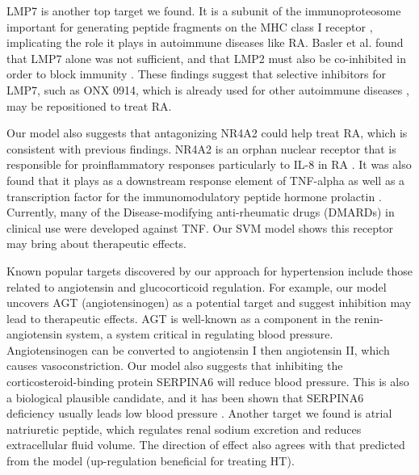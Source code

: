     LMP7 is another top target we found. It is a subunit of the immunoproteosome important for generating peptide fragments on the MHC class I receptor \cite{joeris2012proteasome}, implicating the role it plays in autoimmune diseases like RA. Basler et al. found that LMP7 alone was not sufficient, and that LMP2 must also be co-inhibited in order to block immunity \cite{basler2018co}. These findings suggest that selective inhibitors for LMP7, such as ONX 0914, which is already used for other autoimmune diseases \cite{althof2018immunoproteasome,liu2017onx,verbrugge2012targeting}, may be repositioned to treat RA.
    
    Our model also suggests that antagonizing NR4A2 could help treat RA, which is consistent with previous findings. NR4A2 is an orphan nuclear receptor that is responsible for proinflammatory responses particularly to IL-8 in RA \cite{aherne2009identification}. It was also found that it plays as a downstream response element of TNF-alpha \cite{mix2012orphan} as well as a transcription factor for the immunomodulatory peptide hormone prolactin \cite{mccoy2015orphan}. Currently, many of the Disease-modifying anti-rheumatic drugs (DMARDs) in clinical use were developed against TNF. Our SVM model shows this receptor may bring about therapeutic effects. 

    Known popular targets discovered by our approach for hypertension include those related to  angiotensin and glucocorticoid regulation. For example, our model uncovers AGT (angiotensinogen) as a potential target and suggest inhibition may lead to therapeutic effects. AGT is well-known as a component in the renin-angiotensin system, a system critical in regulating blood pressure. Angiotensinogen can be converted to angiotensin I then angiotensin II, which causes vasoconstriction. Our model also suggests that inhibiting the corticosteroid-binding protein SERPINA6 will reduce blood pressure. This is also a biological plausible candidate, and it has been shown that SERPINA6 deficiency usually leads low blood pressure \cite{torpy2001familial}. Another target we found is atrial natriuretic peptide, which regulates renal sodium excretion and reduces extracellular fluid volume. The direction of effect also agrees with that predicted from the model (up-regulation beneficial for treating HT). 
  
